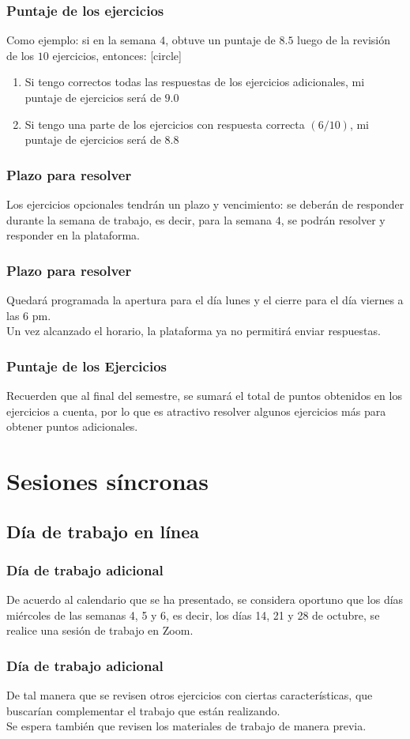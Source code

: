 \documentclass[12pt]{beamer}
\begin{document}
\begin{frame}
\frametitle{Puntaje de los ejercicios}
Como ejemplo: si en la semana $4$, obtuve un puntaje de $8.5$ luego de la revisión de los $10$ ejercicios, entonces:
[circle]
\begin{enumerate}[<+->]
\item Si tengo correctos todas las respuestas de los ejercicios adicionales, mi puntaje de ejercicios  será de $9.0$
\item Si tengo una parte de los ejercicios con respuesta correcta $(6/10)$, mi puntaje de ejercicios será de $8.8$
\end{enumerate}
\end{frame}
\begin{frame}
\frametitle{Plazo para resolver}
Los ejercicios opcionales tendrán un plazo y vencimiento: se deberán de responder durante la semana de trabajo, es decir, para la semana $4$, se podrán resolver y responder en la plataforma.
\end{frame}
\begin{frame}
\frametitle{Plazo para resolver}
Quedará programada la apertura para el día lunes y el cierre para el día viernes a las 6 pm.
\\
\bigskip
Un vez alcanzado el horario, la plataforma ya no permitirá enviar respuestas.
\end{frame}
\begin{frame}
\frametitle{Puntaje de los Ejercicios}
Recuerden que al final del semestre, se sumará el total de puntos obtenidos en los ejercicios a cuenta, por lo que es atractivo resolver algunos ejercicios más para obtener puntos adicionales.
\end{frame}
\section{Sesiones síncronas}
\subsection{Día de trabajo en línea}
\begin{frame}
\frametitle{Día de trabajo adicional}
De acuerdo al calendario que se ha presentado, se considera oportuno que los días miércoles de las semanas 4, 5 y 6, es decir, los días 14, 21 y 28 de octubre, se realice una sesión de trabajo en Zoom.
\end{frame}
\begin{frame}
\frametitle{Día de trabajo adicional}
De tal manera que se revisen otros ejercicios con ciertas características, que buscarían complementar el trabajo que están realizando.
\\
\bigskip
Se espera también que revisen los materiales de trabajo de manera previa.
\end{frame}
\end{document}
